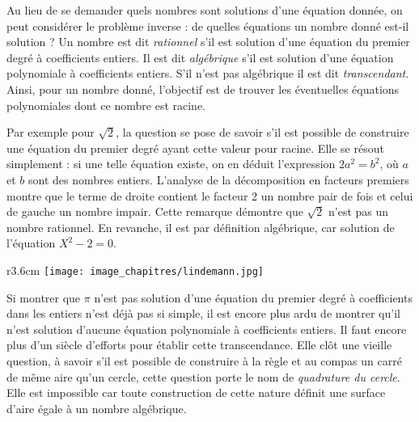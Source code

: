 \begin{His}

Au lieu de se demander quels nombres sont solutions d'une équation donnée, on peut considérer le problème inverse : de quelles équations un nombre donné est-il solution ? Un nombre est dit \textit{rationnel} s'il est solution d'une équation du premier degré à coefficients entiers. Il est dit \textit{algébrique} s'il est solution d'une équation polynomiale à coefficients entiers. S'il n'est pas algébrique il est dit \textit{transcendant}. Ainsi, pour un nombre donné, l'objectif est de trouver les éventuelles équations polynomiales dont ce nombre est racine.

\vspace{0.4cm}

Par exemple pour $\sqrt{2}$, la question se pose de savoir s'il est possible de construire une équation du premier degré ayant cette valeur pour racine. Elle se résout simplement : si une telle équation existe, on en déduit l'expression $2a^2 = b^2$, où $a$ et $b$ sont des nombres entiers. L'analyse de la décomposition en facteurs premiers montre que le terme de droite contient le facteur 2 un nombre pair de fois et celui de gauche un nombre impair. Cette remarque démontre que $\sqrt{2}$ n'est pas un nombre rationnel. En revanche, il est par définition algébrique, car solution de l'équation $X^2-2 = 0$.

%

\vspace{0.4cm}
\begin{wrapfigure}[10]{r}{3.6cm}
\vspace{-7mm}
\texttt{[image: image\_chapitres/lindemann.jpg]} 
\end{wrapfigure}
Si montrer que $\pi$ n'est pas solution d'une équation du premier degré à coefficients dans les entiers n'est déjà pas si simple, il est encore plus ardu de montrer qu'il n'est solution d'aucune équation polynomiale à coefficients entiers. Il faut encore plus d'un siècle d'efforts pour établir cette transcendance. Elle clôt une vieille question, à savoir s'il est possible de construire à la règle et au compas un carré de même aire qu'un cercle, cette question porte le nom de \textit{quadrature du cercle}. Elle est impossible car toute construction de cette nature définit une surface d'aire égale à un nombre algébrique.
\vspace{0.4cm}


\end{His}
